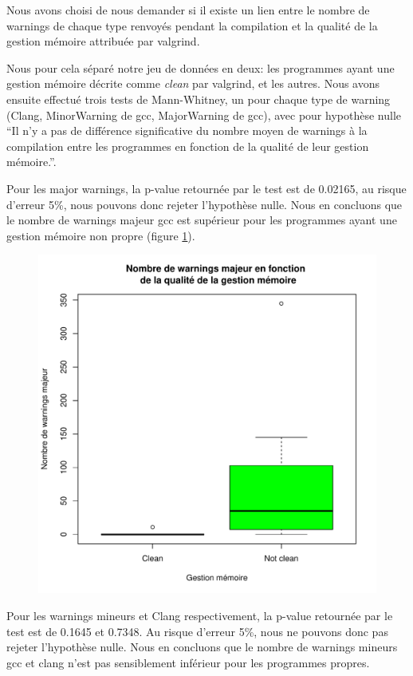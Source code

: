 Nous avons choisi de nous demander si il existe un lien entre le
nombre de warnings de chaque type renvoyés pendant la compilation et la
qualité de la gestion mémoire attribuée par valgrind.

Nous pour cela séparé notre jeu de données en deux: les programmes
ayant une gestion mémoire décrite comme \emph{clean} par valgrind, et les
autres.
Nous avons ensuite effectué trois tests de Mann-Whitney, un pour chaque
type de warning (Clang, MinorWarning de gcc, MajorWarning de gcc),
avec pour hypothèse nulle ``Il n'y a pas de différence significative
du nombre moyen de warnings à la compilation entre les programmes en fonction
de la qualité de leur gestion mémoire.''.

Pour les major warnings, la p-value retournée par le test est de
0.02165, au risque d'erreur 5\%, nous pouvons donc rejeter
l'hypothèse nulle. Nous en concluons que le nombre de warnings majeur gcc
est supérieur pour les programmes ayant une gestion mémoire non propre
(figure \ref{fig:MW_valgr}).

\begin{figure}[h]
  \centering
  \includegraphics[width=.48\textwidth]{figures/MW_valgr.pdf}
  \caption{}\label{fig:MW_valgr}
\end{figure}

Pour les warnings mineurs et Clang respectivement, la p-value retournée
par le test est de 0.1645 et 0.7348. Au risque d'erreur 5\%, nous ne
pouvons donc pas rejeter l'hypothèse nulle. Nous en concluons que le
nombre de warnings mineurs gcc et clang n'est pas sensiblement inférieur
pour les programmes propres.
